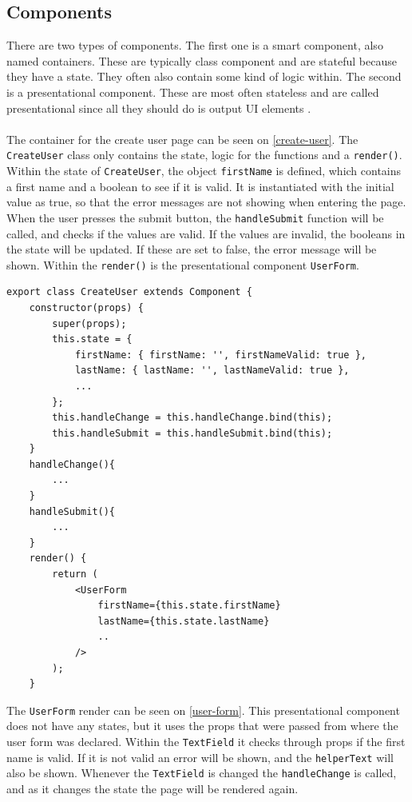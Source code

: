 \subsection{Components}
There are two types of components. 
The first one is a smart component, also named containers.
These are typically class component and are stateful because they have a state.
They often also contain some kind of logic within.
The second is a presentational component.
These are most often stateless and are called presentational since all they should do is output UI elements \cite{Vumbula-react}.
\\\\
The container for the create user page can be seen on \autoref{create-user}.
The \texttt{CreateUser} class only contains the state, logic for the functions and a \texttt{render()}.
Within the state of \texttt{CreateUser}, the object \texttt{firstName} is defined, which contains a first name and a boolean to see if it is valid.
It is instantiated with the initial value as true, so that the error messages are not showing when entering the page.
When the user presses the submit button, the \texttt{handleSubmit} function will be called, and checks if the values are valid.
If the values are invalid, the booleans in the state will be updated. 
If these are set to false, the error message will be shown.
Within the \texttt{render()} is the presentational component \texttt{UserForm}. 
\begin{lstlisting}[caption={Component to create user}, captionpos=b, label={create-user}]
export class CreateUser extends Component {
    constructor(props) {
        super(props);
        this.state = {
            firstName: { firstName: '', firstNameValid: true },
            lastName: { lastName: '', lastNameValid: true },
            ...
        };
        this.handleChange = this.handleChange.bind(this);
        this.handleSubmit = this.handleSubmit.bind(this);
    }
    handleChange(){
        ...
    }
    handleSubmit(){
        ...
    }
    render() {
        return (
            <UserForm
                firstName={this.state.firstName}
                lastName={this.state.lastName}
                ..
            />
        );
    }
\end{lstlisting}

The \texttt{UserForm} render can be seen on \autoref{user-form}.
This presentational component does not have any states, but it uses the props that were passed from where the user form was declared.
Within the \texttt{TextField} it checks through props if the first name is valid. 
If it is not valid an error will be shown, and the \texttt{helperText} will also be shown.
Whenever the \texttt{TextField} is changed the \texttt{handleChange} is called, and as it changes the state the page will be rendered again.

